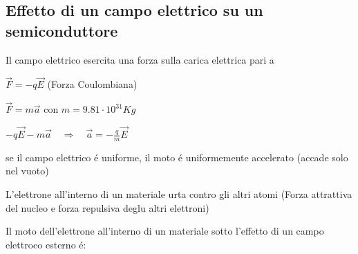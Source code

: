 \subsection{Effetto di un campo elettrico su un semiconduttore}
Il campo elettrico esercita una forza sulla carica elettrica pari a

$\vec{F} = -q\vec{E}$ (Forza Coulombiana)

$\vec{F} = m\vec{a}$ con $m=9.81\cdot 10^{31}Kg$

$-q\vec{E} - m\vec{a} \quad \Rightarrow \quad \vec{a} = -\frac{q}{m}\vec{E}$

se il campo elettrico \'e uniforme, il moto \'e uniformemente accelerato (accade solo nel vuoto)

L'elettrone all'interno di un materiale urta contro gli altri atomi (Forza attrattiva del nucleo e forza repulsiva deglu altri elettroni)

Il moto dell'elettrone all'interno di un materiale sotto l'effetto di un campo elettroco esterno \'e:


